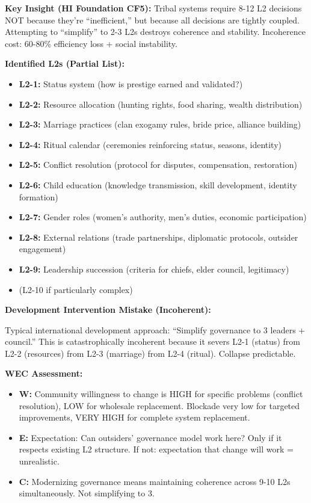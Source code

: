 \documentclass[11pt, a4paper]{article}
\begin{document}
\textbf{Key Insight (HI Foundation CF5):} Tribal systems require 8-12 L2 decisions NOT because they're ``inefficient,'' but because all decisions are tightly coupled. Attempting to ``simplify'' to 2-3 L2s destroys coherence and stability. Incoherence cost: 60-80\% efficiency loss + social instability.

\textbf{Identified L2s (Partial List):}
\begin{itemize}[nosep]
    \item \textbf{L2-1:} Status system (how is prestige earned and validated?)
    \item \textbf{L2-2:} Resource allocation (hunting rights, food sharing, wealth distribution)
    \item \textbf{L2-3:} Marriage practices (clan exogamy rules, bride price, alliance building)
    \item \textbf{L2-4:} Ritual calendar (ceremonies reinforcing status, seasons, identity)
    \item \textbf{L2-5:} Conflict resolution (protocol for disputes, compensation, restoration)
    \item \textbf{L2-6:} Child education (knowledge transmission, skill development, identity formation)
    \item \textbf{L2-7:} Gender roles (women's authority, men's duties, economic participation)
    \item \textbf{L2-8:} External relations (trade partnerships, diplomatic protocols, outsider engagement)
    \item \textbf{L2-9:} Leadership succession (criteria for chiefs, elder council, legitimacy)
    \item (L2-10 if particularly complex)
\end{itemize}

\textbf{Development Intervention Mistake (Incoherent):}

Typical international development approach: ``Simplify governance to 3 leaders + council.'' This is catastrophically incoherent because it severs L2-1 (status) from L2-2 (resources) from L2-3 (marriage) from L2-4 (ritual). Collapse predictable.

\textbf{WEC Assessment:}
\begin{itemize}[nosep]
    \item \textbf{W:} Community willingness to change is HIGH for specific problems (conflict resolution), LOW for wholesale replacement. Blockade very low for targeted improvements, VERY HIGH for complete system replacement.
    \item \textbf{E:} Expectation: Can outsiders' governance model work here? Only if it respects existing L2 structure. If not: expectation that change will work = unrealistic.
    \item \textbf{C:} Modernizing governance means maintaining coherence across 9-10 L2s simultaneously. Not simplifying to 3.
\end{itemize}
\end{document}

